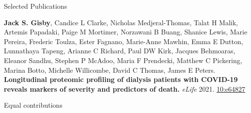 \documentclass{resume}
\begin{document}
\begin{rSection}{Selected Publications}
\vspace{4pt plus 1pt}

\item \textbf{Jack S. Gisby}\textsuperscript{\textdagger}, Candice L Clarke\textsuperscript{\textdagger}, Nicholas Medjeral-Thomas\textsuperscript{\textdagger}, Talat H Malik, Artemis Papadaki, Paige M Mortimer, Norzawani B Buang, Shanice Lewis, Marie Pereira, Frederic Toulza, Ester Fagnano, Marie-Anne Mawhin, Emma E Dutton, Lunnathaya Tapeng, Arianne C Richard, Paul DW Kirk, Jacques Behmoaras, Eleanor Sandhu, Stephen P McAdoo, Maria F Prendecki, Matthew C Pickering, Marina Botto, Michelle Willicombe\textsuperscript{\textdagger}, David C Thomas\textsuperscript{\textdagger}, James E Peters\textsuperscript{\textdagger}. \textbf{Longitudinal proteomic profiling of dialysis patients with COVID-19 reveals markers of severity and predictors of death.} \textit{eLife} 2021. \href{https://doi.org/10.7554/eLife.64827}{10:e64827}

\textdagger Equal contributions

\end{rSection}

\pagebreak
\end{document}
